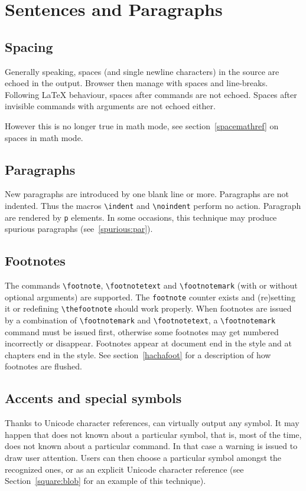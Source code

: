 \section{Sentences and Paragraphs}

\subsection{Spacing}
Generally speaking, spaces (and single newline characters) in the
source are echoed in the output.  Browser then manage with spaces and
line-breaks.  Following \LaTeX{} behaviour, spaces after commands are
not echoed.  Spaces after invisible commands with arguments are not
echoed either.

However this is no longer true in math mode, see
section~\ref{spacemathref} on spaces in math mode.

\subsection{Paragraphs}
New paragraphs are introduced by one blank line or more.
Paragraphs are not indented. Thus the macros \verb+\indent+ and
\verb+\noindent+ perform no action.
Paragraph are rendered by \verb+p+ elements.
In some occasions, this technique may produce spurious paragraphs
(see~\ref{spurious:par}).

\subsection{Footnotes}
The commands \verb+\footnote+,
\verb+\footnotetext+ and \verb+\footnotemark+ (with or without
optional arguments) are supported.
The \verb+footnote+ counter exists and (re)setting it or redefining
\verb+\thefootnote+ should work properly.
When footnotes are issued by a combination of \verb+\footnotemark+ and
\verb+\footnotetext+, a \verb+\footnotemark+
command must be issued
first, otherwise some footnotes may get numbered incorrectly or disappear.
Footnotes appear at document end in the  style and
at chapters end in the  style.
See section~\ref{hachafoot} for a description of how footnotes are flushed.


\subsection{Accents\label{accents} and special symbols}
Thanks to Unicode character references, \hevea{} can virtually output
any symbol.
It may happen that \hevea{} does not known about a particular symbol,
that is, most of the time, \hevea{} does not known about a particular
command. In that case a warning is issued to draw user attention.
Users can then choose a particular symbol amongst the recognized ones,
or as an explicit Unicode character reference (see
Section~\ref{square:blob} for an example of this technique).

